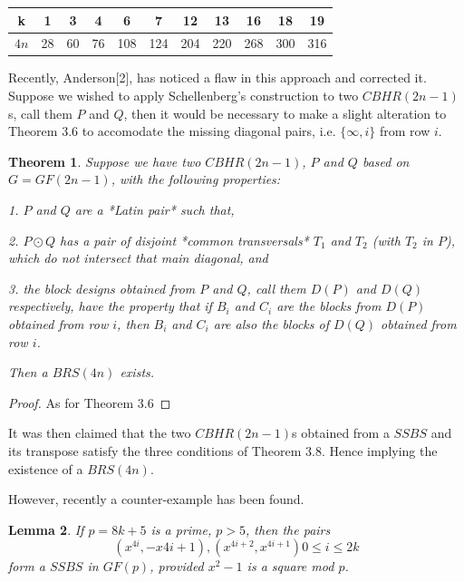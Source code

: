 \documentclass[
  11pt,
  a4paper]{book}
\newtheorem{theorem}{Theorem}
\newtheorem{lemma}[theorem]{Lemma}
\begin{document}
\begin{tabular}{|c|c|c|c|c|c|c|c|c|c|c|}
\hline
  k  &  1 &  3 &  4 &   6 &   7 &  12 &  13 &  16 &  18 & 19 \\ \hline
$4n$ & 28 & 60 & 76 & 108 & 124 & 204 & 220 & 268 & 300 & 316 \\ \hline
\end{tabular}

Recently, Anderson{[}2{]}, has noticed a flaw in this approach
and corrected it. Suppose we wished to apply Schellenberg's
construction to two \(CBHR(2n - 1)\)s, call them \(P\) and \(Q\),
then it would be necessary to make a slight alteration to
Theorem 3.6 to accomodate the missing diagonal pairs, i.e.
\(\{\infty, i\}\) from row \(i\).

\begin{theorem}
Suppose we have two $CBHR(2n-1)$, $P$ and $Q$ based on
$G=GF(2n-1)$, with the following properties:

1.  $P$ and $Q$ are a *Latin pair* such that,

2.  $P \odot Q$ has a pair of disjoint *common transversals* $T_1$ and
    $T_2$ (with $T_2$ in $P$), which do not intersect that main
    diagonal, and

3.  the block designs obtained from $P$ and $Q$, call them $D(P)$ and
    $D(Q)$ respectively, have the property that if $B_i$ and $C_i$ are
    the blocks from $D(P)$ obtained from row $i$, then $B_i$ and $C_i$
    are also the blocks of $D(Q)$ obtained from row $i$.

Then a $BRS(4n)$ exists.
\end{theorem}

\begin{proof}
As for Theorem 3.6
\end{proof}

It was then claimed that the two \(CBHR(2n - 1)\)s obtained from
a \(SSBS\) and its transpose satisfy the three conditions of
Theorem 3.8. Hence implying the existence of a \(BRS(4n)\).

However, recently a counter-example has been found.

\begin{lemma}
If $p = 8k + 5$ is a prime, $p > 5$, then the pairs
$$(x^{4i}, -x{4i + 1}), (x^{4i + 2}, x^{4i + 1}) 0 \leq i \leq 2k$$
form a $SSBS$ in $GF(p)$, provided $x^2 - 1$ is a square mod
$p$.
\end{lemma}
\end{document}
